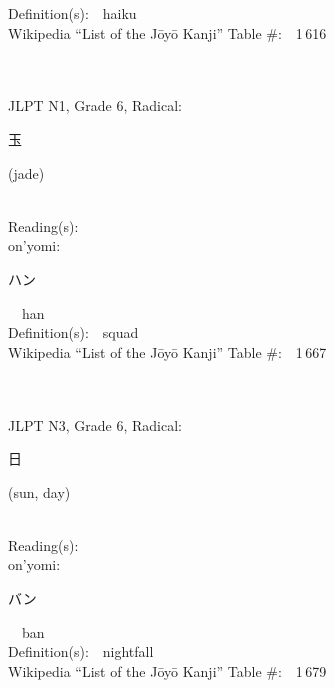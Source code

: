 \begin{multicols}{2}
Definition(s):\ \ haiku \\
Wikipedia ``List of the J\=oy\=o Kanji'' Table \#:\ \ 1\,616 \\
\ \ \\
{\fontsize{34pt}{40pt}  }\ \ \\  %
{JLPT N1, Grade 6, Radical:\ \ {\begin{CJK}{UTF8}{min} 玉 \end{CJK}} (jade) } \\
Reading(s):\ \ \\
{\hspace*{1em}}on'yomi:\ \ \\
{\hspace*{2em}}{\begin{CJK}{UTF8}{min} ハン \end{CJK}}\ \ han\ \ \\
Definition(s):\ \ squad \\
Wikipedia ``List of the J\=oy\=o Kanji'' Table \#:\ \ 1\,667 \\
\ \ \\
{\fontsize{34pt}{40pt}  }\ \ \\  %
{JLPT N3, Grade 6, Radical:\ \ {\begin{CJK}{UTF8}{min} 日 \end{CJK}} (sun, day) } \\
Reading(s):\ \ \\
{\hspace*{1em}}on'yomi:\ \ \\
{\hspace*{2em}}{\begin{CJK}{UTF8}{min} バン \end{CJK}}\ \ ban\ \ \\
Definition(s):\ \ nightfall \\
Wikipedia ``List of the J\=oy\=o Kanji'' Table \#:\ \ 1\,679 \\
\ \ \\
{\fontsize{34pt}{40pt}  }\ \ \\  %

\end{multicols}
